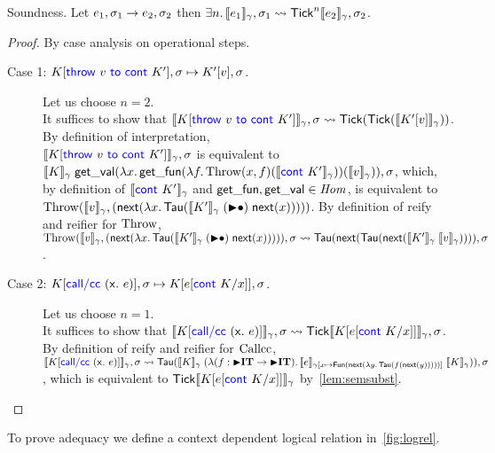 \begin{lemma}{Soundness.}
  \label{lem:soundness}
  Let ${e_1, \sigma_1}\to{e_2, \sigma_2}$
  then $\Exists n. \sem{\expr_1}_\gamma, \sigma_1 \istep \Tick^n \sem{\expr_2}_\gamma, \sigma_2$.
\end{lemma}
\begin{proof}
  By case analysis on operational steps.
  \begin{description}
  \item[Case 1: ${{K}[{\mathsf{\color{blue} throw}~{v}~\mathsf{\color{blue} to}~{\mathsf{\color{blue} cont}~{K'}}}], \sigma}\mapsto{{K'}[{v}], \sigma}$.]
    Let us choose $n = 2$. \\
    It suffices to show that $\llbracket{{K}[{\mathsf{\color{blue} throw}~{v}~\mathsf{\color{blue} to}~{\mathsf{\color{blue} cont}~{K'}}}]}\rrbracket_\gamma, \sigma \rightsquigarrow \mathsf{Tick} (\mathsf{Tick} (\llbracket{{K'}[{v}]}\rrbracket_\gamma))$.
    By definition of interpretation,\\
    $\llbracket{{K}[{\mathsf{\color{blue} throw}~{v}~\mathsf{\color{blue} to}~{\mathsf{\color{blue} cont}~{K'}}}]}\rrbracket_\gamma, \sigma$ is equivalent to $\eapp{\sem{K}_\gamma}{\getval (\Lam x. \getfun (\Lam f. \throwGT(x, f) (\sem{\cont{K'}}_\gamma)) (\sem{\val}_\gamma))}, \sigma$, which, by definition of $\llbracket{\mathsf{\color{blue} cont}~{K'}}\rrbracket_\gamma$ and $\mathsf{get\_fun}, \mathsf{get\_val} \in \mathit{Hom}$, is equivalent to\\
    $\throwGT(\sem{\val}_\gamma, (\Next(\Lam x. \Tau(\APPsl{\sem{K'}_\gamma}{\Next(x)}))))$.
    By definition of reify and reifier for $\mathrm{Throw}$,
    $\throwGT(\sem{\val}_\gamma, (\Next(\Lam x. \Tau(\APPsl{\sem{K'}_\gamma}{\Next(x)})))), \sigma \istep \Tau (\Next (\Tau (\Next (\eapp{\sem{K'}_\gamma}{\sem{v}_\gamma})))), \sigma$.
  \item[Case 2: ${{K}[{\mathsf{\color{blue} call/cc}~({\mathsf{{x}}}{\mathsf{.}}~{e})}], \sigma}\mapsto{{K}[{{e}[{\mathsf{\color{blue} cont}~{K}} / {x}]}], \sigma}$.]
    Let us choose $n = 1$. \\
    It suffices to show that $\llbracket{{K}[{\mathsf{\color{blue} call/cc}~({\mathsf{{x}}}{\mathsf{.}}~{e})}]}\rrbracket_\gamma, \sigma \rightsquigarrow \mathsf{Tick} \llbracket{{K}[{{e}[{\mathsf{\color{blue} cont}~{K}} / {x}]}]}\rrbracket_\gamma, \sigma$.
    By definition of reify and reifier for $\mathrm{Callcc}$,\\
    $\sem{\plug{K}{\callcc{\var}{\expr}}}_\gamma, \sigma \istep \Tau(\eapp{\sem{K}_\gamma}{(\eapp{\Lam (f \col \latert \IT \rightarrow \latert \IT). \sem{\expr}_{\gamma[\var \mapsto \Fun (\Next (\Lam y. \Tau (f (\Next (y)))))]}}{\sem{K}_\gamma})}), \sigma$,
    which is equivalent to $\mathsf{Tick} \llbracket{{K}[{{e}[{\mathsf{\color{blue} cont}~{K}} / {x}]}]}\rrbracket_\gamma$
    by~\cref{lem:semsubst}.
  \end{description}
\end{proof}

To prove adequacy we define a context dependent logical relation
in~\cref{fig:logrel}.

